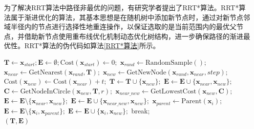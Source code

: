 为了解决RRT算法中路径非最优的问题，有研究学者提出了RRT*算法。RRT*算法属于渐进优化的算法，其基本思想是在随机树中添加新节点时，通过对新节点邻域半径内的节点进行选择性地重连操作，以保证选取的是当前范围内的最优父节点，并借助新节点使用重布线优化机制动态优化树结构，进一步确保路径的渐进最优性。RRT*算法的伪代码如算法\ref{RRT*算法}所示。
\begin{algorithm}
    \caption{RRT*算法}
    \label{RRT*算法}
    \begin{algorithmic}[1]
        \setlength{\baselineskip}{16pt}
        \State $\boldsymbol{T}\leftarrow\boldsymbol{x}_{start};\boldsymbol{E}\leftarrow\emptyset; \text{Cost}(\boldsymbol{x}_{start}) \gets 0;$
            \State $\boldsymbol{x}_{rand}\gets\text{RandomSample}();$
            \State $\boldsymbol{x}_{near}\gets\text{GetNearest}(\boldsymbol{x}_{rand},\boldsymbol{T});$
            \State $\boldsymbol{x}_{new}\gets\text{GetNewNode}(\boldsymbol{x}_{rand},\boldsymbol{x}_{near},step);$
                \State $\text{Cost}(\boldsymbol{x}_{new})\gets\text{Cost}(\boldsymbol{x}_{near}) + t ;$
                \State $\boldsymbol{T}\leftarrow \boldsymbol{T}\cup\{\boldsymbol{x}_{new}\};$
                $\boldsymbol{E}\leftarrow \boldsymbol{E}\cup\{\boldsymbol{x}_{near},\boldsymbol{x}_{new}\};$
                \State $\boldsymbol{C}\gets\text{GetNodeInCircle}(\boldsymbol{x}_{new},\boldsymbol{T},r);$
                    \State $\boldsymbol{x}_{near\_new}\gets\text{GetLowestCost}(\boldsymbol{x}_{new},\boldsymbol{C});$
                    \State $\boldsymbol{E}\leftarrow \boldsymbol{E}\setminus\{\boldsymbol{x}_{near},\boldsymbol{x}_{new}\};$
                    $\boldsymbol{E}\leftarrow \boldsymbol{E}\cup\{\boldsymbol{x}_{near\_new},\boldsymbol{x}_{new}\};$
                            \State $\boldsymbol{x}_{parent}\gets\text{Parent}(\boldsymbol{x}_{i});$
                            \State $\boldsymbol{E}\leftarrow \boldsymbol{E}\setminus\{\boldsymbol{x}_{i},\boldsymbol{x}_{parent}\};$
                            $\boldsymbol{E}\leftarrow \boldsymbol{E}\cup\{\boldsymbol{x}_{i},\boldsymbol{x}_{new}\};$
                        \EndIf
                    \EndFor
                \EndIf
                \State break;
                \EndIf
            \EndIf
        \EndWhile \\
        \Return $(\boldsymbol{T},\boldsymbol{E})$
\end{algorithmic}
\end{algorithm}

